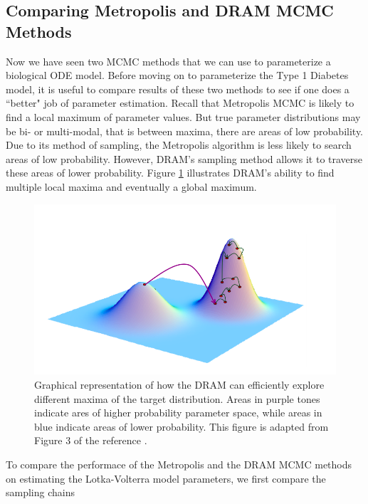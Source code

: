 \subsection{Comparing Metropolis and DRAM MCMC Methods} \label{Comparing Metropolis_and_DRAM_MCMC_Methods}
Now we have seen two MCMC methods that we can use to parameterize a biological ODE model. Before moving on to parameterize the Type 1 Diabetes model, it is useful to compare results of these two methods to see if one does a ``better" job of parameter estimation. Recall that Metropolis MCMC is likely to find a local maximum of parameter values. But true parameter distributions may be bi- or multi-modal, that is between maxima, there are areas of low probability. Due to its method of sampling, the Metropolis algorithm is less likely to search areas of low probability. However, DRAM's sampling method allows it to traverse these areas of lower probability. Figure \ref{fig:globalmax} illustrates DRAM's ability to find multiple local maxima and eventually a global maximum.
\begin{figure}[H]
    \centering
    \includegraphics[width=15cm]{MCMC_figs/dram_t1d_final/multimodal_search.png}
    \caption{Graphical representation of how the DRAM can efficiently explore different maxima of the target distribution. Areas in purple tones indicate ares of higher probability parameter space, while areas in blue indicate areas of lower probability. This figure is adapted from Figure 3 of the reference \cite{trias2009delayed}.}
    \label{fig:globalmax}
\end{figure}
\par To compare the performace of the Metropolis and the DRAM MCMC methods on estimating the Lotka-Volterra model parameters, we first compare the sampling chains
